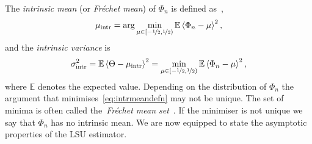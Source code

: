 \documentclass[aap]{imsart}
\newcommand{\expect}{{\mathbb E}}
\newcommand{\fracpart}[1]{\left\langle #1 \right\rangle}
\begin{document}
The \emph{intrinsic mean} (or \emph{Fr\'{e}chet mean}) of $\Phi_n$ is defined as~\cite{McKilliam_mean_dir_est_sq_arc_length2010,Bhattacharya_int_ext_means_2003,Bhattacharya_int_ext_means_2005},
\begin{equation}\label{eq:intrmeandefn}
 \mu_{\text{intr}}  = \arg \min_{\mu \in [-\nicefrac{1}{2}, \nicefrac{1}{2})} \expect \fracpart{\Phi_n - \mu}^2, 
\end{equation}
and the \emph{intrinsic variance} is
\[
\sigma_{\text{intr}}^2 = \expect\fracpart{\Theta - \mu_{\text{intr}}}^2 = \min_{\mu \in [-\nicefrac{1}{2}, \nicefrac{1}{2})} \expect \fracpart{\Phi_n - \mu}^2,
\]
where $\expect$ denotes the expected value.  Depending on the distribution of $\Phi_n$ the argument that minimises~\eqref{eq:intrmeandefn} may not be unique.  The set of minima is often called the~\emph{Fr\'{e}chet mean set}~\cite{Bhattacharya_int_ext_means_2003,Bhattacharya_int_ext_means_2005}.  If the minimiser is not unique we say that $\Phi_n$ has no intrinsic mean.  We are now equipped to state the asymptotic properties of the LSU estimator.


 
\end{document}
